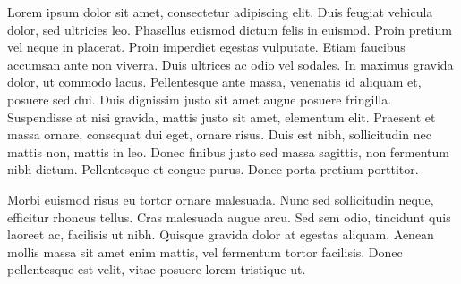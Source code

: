 \documentclass[a4paper,11pt]{article}
\begin{document}
\begin{mlsolution}
 Lorem ipsum dolor sit amet, consectetur adipiscing elit. Duis feugiat vehicula dolor, sed ultricies leo. Phasellus euismod dictum felis in euismod. Proin pretium vel neque in placerat. Proin imperdiet egestas vulputate. Etiam faucibus accumsan ante non viverra. Duis ultrices ac odio vel sodales. In maximus gravida dolor, ut commodo lacus. Pellentesque ante massa, venenatis id aliquam et, posuere sed dui. Duis dignissim justo sit amet augue posuere fringilla. Suspendisse at nisi gravida, mattis justo sit amet, elementum elit. Praesent et massa ornare, consequat dui eget, ornare risus. Duis est nibh, sollicitudin nec mattis non, mattis in leo. Donec finibus justo sed massa sagittis, non fermentum nibh dictum. Pellentesque et congue purus. Donec porta pretium porttitor.

Morbi euismod risus eu tortor ornare malesuada. Nunc sed sollicitudin neque, efficitur rhoncus tellus. Cras malesuada augue arcu. Sed sem odio, tincidunt quis laoreet ac, facilisis ut nibh. Quisque gravida dolor at egestas aliquam. Aenean mollis massa sit amet enim mattis, vel fermentum tortor facilisis. Donec pellentesque est velit, vitae posuere lorem tristique ut. 
\end{mlsolution}
					
\end{document}
